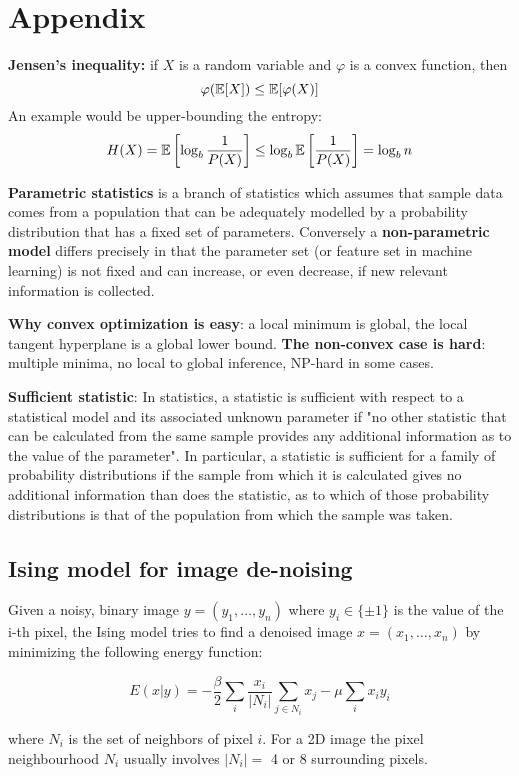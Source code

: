 \documentclass[12pt]{article}
\begin{document}
\section{Appendix}
\par \textbf{Jensen's inequality: } if $X$ is a random variable and $\varphi$ is a convex function, then
\[ \varphi(\operatorname{\mathbb{E}}[X]) \leq \operatorname{\mathbb{E}}[\varphi(X)] \]
An example would be upper-bounding the entropy:
\[ H(X) = \operatorname{\mathbb{E}}\left[\log_b \frac{1}{P(X)}\right] \leq \log_b \operatorname{\mathbb{E}}\left[\frac{1}{P(X)}\right] = \log_b n \]
\par \textbf{Parametric statistics} is a branch of statistics which assumes that sample data comes from a population that can be adequately modelled by a probability distribution that has a fixed set of parameters. Conversely a \textbf{non-parametric model} differs precisely in that the parameter set (or feature set in machine learning) is not fixed and can increase, or even decrease, if new relevant information is collected.
\par \textbf{Why convex optimization is easy}: a local minimum is global, the local tangent hyperplane is a global lower bound. \textbf{The non-convex case is hard}: multiple minima, no local to global inference, NP-hard in some cases.
\par \textbf{Sufficient statistic}: In statistics, a statistic is sufficient with respect to a statistical model and its associated unknown parameter if "no other statistic that can be calculated from the same sample provides any additional information as to the value of the parameter". In particular, a statistic is sufficient for a family of probability distributions if the sample from which it is calculated gives no additional information than does the statistic, as to which of those probability distributions is that of the population from which the sample was taken.

\subsection{Ising model for image de-noising}
Given a noisy, binary image $y=(y_1,\dots,y_n)$ where $y_i\in\{\pm1\}$ is the value of the i-th pixel, the Ising model tries to find a denoised image $x=(x_1,\dots,x_n)$ by minimizing the following energy function:

$$E(x|y) = - \frac{\beta}{2} \sum_{i} \frac{x_i}{\lvert N_i\rvert}\sum_{j \in N_i} x_j - \mu \sum_{i} x_i y_i$$

where $N_i$ is the set of neighbors of pixel $i$. For a 2D image the pixel neighbourhood $N_i$ usually involves $\lvert N_i\rvert=$ 4 or 8 surrounding pixels.
\end{document}
